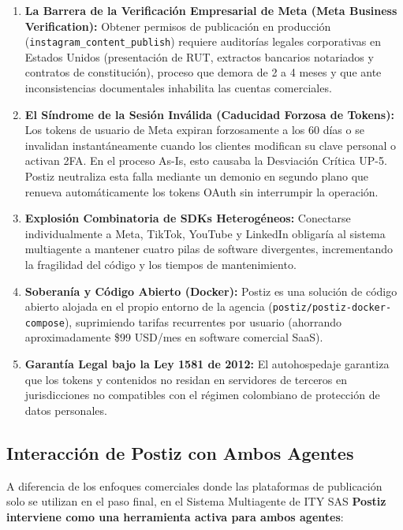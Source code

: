 \documentclass[11pt,a4paper]{article}
\begin{document}
\begin{enumerate}
    \item \textbf{La Barrera de la Verificación Empresarial de Meta (Meta Business Verification):} Obtener permisos de publicación en producción (\texttt{instagram\_content\_publish}) requiere auditorías legales corporativas en Estados Unidos (presentación de RUT, extractos bancarios notariados y contratos de constitución), proceso que demora de 2 a 4 meses y que ante inconsistencias documentales inhabilita las cuentas comerciales.
    \item \textbf{El Síndrome de la Sesión Inválida (Caducidad Forzosa de Tokens):} Los tokens de usuario de Meta expiran forzosamente a los 60 días o se invalidan instantáneamente cuando los clientes modifican su clave personal o activan 2FA. En el proceso As-Is, esto causaba la Desviación Crítica UP-5. Postiz neutraliza esta falla mediante un demonio en segundo plano que renueva automáticamente los tokens OAuth sin interrumpir la operación.
    \item \textbf{Explosión Combinatoria de SDKs Heterogéneos:} Conectarse individualmente a Meta, TikTok, YouTube y LinkedIn obligaría al sistema multiagente a mantener cuatro pilas de software divergentes, incrementando la fragilidad del código y los tiempos de mantenimiento.
    \item \textbf{Soberanía y Código Abierto (Docker):} Postiz es una solución de código abierto alojada en el propio entorno de la agencia (\texttt{postiz/postiz-docker-compose}), suprimiendo tarifas recurrentes por usuario (ahorrando aproximadamente \$99 USD/mes en software comercial SaaS).
    \item \textbf{Garantía Legal bajo la Ley 1581 de 2012:} El autohospedaje garantiza que los tokens y contenidos no residan en servidores de terceros en jurisdicciones no compatibles con el régimen colombiano de protección de datos personales.
\end{enumerate}

\subsection{Interacción de Postiz con Ambos Agentes}\label{sec:postiz-agentes}

A diferencia de los enfoques comerciales donde las plataformas de publicación solo se utilizan en el paso final, en el Sistema Multiagente de ITY SAS \textbf{Postiz interviene como una herramienta activa para ambos agentes}:
\end{document}
